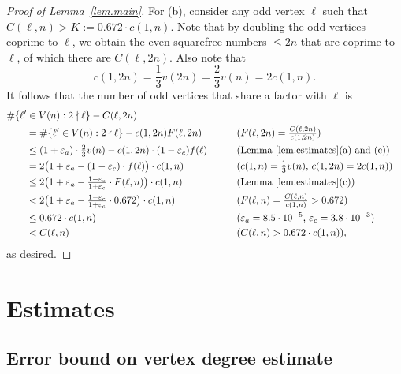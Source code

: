 \documentclass{article}
\theoremstyle{plain}
\theoremstyle{definition}
\theoremstyle{remark}
\begin{document}
\begin{proof}[Proof of Lemma~\ref{lem.main}]
For (b), consider any odd vertex $\ell$ such that $C(\ell,n)> K:=0.672\cdot c(1,n)$. 
Note that by doubling the odd vertices coprime to $\ell$, we obtain the even squarefree numbers $\leq 2n$ that are coprime to $\ell$, of which there are $C(\ell,2n)$.
Also note that
\[
c(1,2n)
=\frac{1}{3}v(2n)
=\frac{2}{3}v(n)
=2c(1,n).
\]
It follows that the number of odd vertices that share a factor with $\ell$ is
\[
\begin{aligned}
&\#\{\ell'\in V(n):2\nmid\ell\}-C(\ell,2n)\\
&\qquad=\#\{\ell'\in V(n):2\nmid\ell\} - c(1,2n) F( \ell, 2n )&&\text{($F( \ell, 2n )=\tfrac{C(\ell,2n)}{c(1,2n)}$)} \\
&\qquad\leq(1+\varepsilon_a)\cdot\tfrac{2}{3}v(n) - c(1,2n)\cdot(1-\varepsilon_c)f(\ell)\qquad&&\text{(Lemma~\ref{lem.estimates}(a) and (c))}\\
&\qquad=2\big(1+\varepsilon_a-(1-\varepsilon_c)\cdot f(\ell)\big)\cdot c(1,n)&&\text{($c(1,n)=\tfrac{1}{3}v(n)$, $c(1,2n)=2c(1,n)$)}\\
&\qquad\leq2\big(1+\varepsilon_a-\tfrac{1-\varepsilon_c}{1+\varepsilon_c}\cdot F(\ell,n)\big)\cdot c(1,n)&&\text{(Lemma~\ref{lem.estimates}(c))}\\
&\qquad< 2\big(1+\varepsilon_a-\tfrac{1-\varepsilon_c}{1+\varepsilon_c}\cdot 0.672\big)\cdot c(1,n)&&\text{$(F( \ell, n )=\tfrac{C(\ell,n)}{c(1,n)}>0.672$)}\\
&\qquad\leq 0.672\cdot c(1,n)&&\text{($\varepsilon_a=8.5\cdot10^{-5}$, $\varepsilon_c=3.8\cdot10^{-3}$)}\\
&\qquad<C(\ell,n)&&\text{($C(\ell,n)>0.672\cdot c(1,n)$)},
\end{aligned}
\]
as desired.
\end{proof}

\section{Estimates}
\label{sec.estimates}

\subsection{Error bound on vertex degree estimate}
\end{document}
